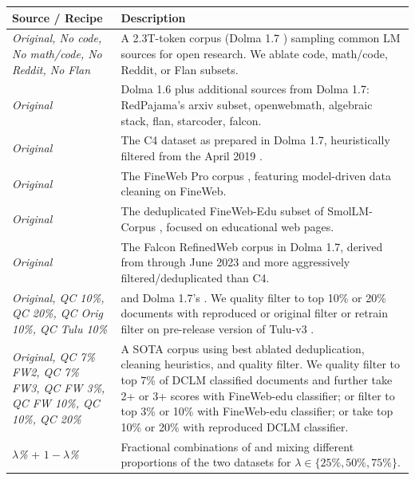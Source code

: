 \begin{tabular}{p{} p{}}

\toprule
\textbf{Source / Recipe} & \textbf{Description}\\
\midrule

\textbf{\dolmaSeventeen{}} \emph{Original, No code, No math/code, No Reddit, No Flan}
& A 2.3T-token corpus (Dolma 1.7 \citealp{dolma}) sampling common LM sources for open research. We ablate code, math/code, Reddit, or Flan subsets.\\

\textbf{\dolmaVSixteenAndSourcesBaseline{}} \emph{Original}
& Dolma 1.6 plus additional sources from Dolma 1.7: RedPajama’s arxiv subset, openwebmath, algebraic stack, flan, starcoder, falcon. \\

\textbf{\cFour{}} \emph{Original}
& The C4 dataset \citep{2019t5} as prepared in Dolma 1.7, heuristically filtered from the April 2019 \citet{commoncrawl}. \\

\textbf{\proxFinewebPro{}} \emph{Original}
& The FineWeb Pro corpus \citep{zhou2024programming}, featuring model-driven data cleaning on FineWeb. \\

\textbf{\finewebEduDedup{}} \emph{Original}
& The deduplicated FineWeb-Edu subset of SmolLM-Corpus \citep{benallal2024smollmcorpus}, focused on educational web pages. \\

\textbf{\falcon{}} \emph{Original}
& The Falcon RefinedWeb corpus \citep{Penedo2023TheRD} in Dolma 1.7, derived from \citet{commoncrawl} through June 2023 and more aggressively filtered/deduplicated than C4. \\

\textbf{\falconAndCc{}} \emph{Original, QC 10\%, QC 20\%, QC Orig 10\%, QC Tulu 10\%}
& \falcon{} and Dolma 1.7’s \citet{commoncrawl}. We quality filter to top 10\% or 20\% documents with reproduced or original \cite{li2024datacomplmsearchgenerationtraining} filter or retrain filter on pre-release version of Tulu-v3 \citep{lambert2024tulu3}. \\

\textbf{\DCLMBaseline{}} \emph{Original, QC 7\% FW2, QC 7\% FW3, QC FW 3\%, QC FW 10\%, QC 10\%, QC 20\%}
& A SOTA \citet{commoncrawl} corpus using best ablated deduplication, cleaning heuristics, and quality filter. We quality filter to top 7\% of DCLM classified documents and further take 2+ or 3+ scores with FineWeb-edu classifier; or filter to top 3\% or 10\%  with FineWeb-edu classifier; or take top 
10\% or 20\% with reproduced DCLM classifier. \\
 \emph{$\lambda$\%} \textbf{\DCLMBaseline{}} + \emph{$1-\lambda$\%} \textbf{\dolmaSeventeen{}}
& Fractional combinations of \dolmaSeventeen{} and \DCLMBaseline{}
mixing different proportions of the two datasets for $\lambda \in \{25\%, 50\%, 75\%\}$. \\

\bottomrule
\end{tabular}
